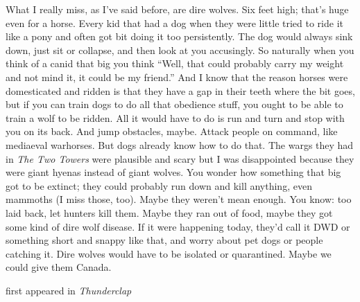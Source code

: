 What I really miss, as I've said before, are dire wolves. Six feet high;
that's huge even for a horse. Every kid that had a dog when they were
little tried to ride it like a pony and often got bit doing it too
persistently. The dog would always sink down, just sit or collapse, and
then look at you accusingly. So naturally when you think of a canid that
big you think ``Well, that could probably carry my weight and not mind
it, it could be my friend.'' And I know that the reason horses were
domesticated and ridden is that they have a gap in their teeth where the
bit goes, but if you can train dogs to do all that obedience stuff, you
ought to be able to train a wolf to be ridden. All it would have to do
is run and turn and stop with you on its back. And jump obstacles,
maybe. Attack people on command, like mediaeval warhorses. But dogs
already know how to do that. The wargs they had in \emph{The Two Towers}
were plausible and scary but I was disappointed because they were giant
hyenas instead of giant wolves. You wonder how something that big got to
be extinct; they could probably run down and kill anything, even
mammoths (I miss those, too). Maybe they weren't mean enough. You know:
too laid back, let hunters kill them. Maybe they ran out of food, maybe
they got some kind of dire wolf disease. If it were happening today,
they'd call it DWD or something short and snappy like that, and worry
about pet dogs or people catching it. Dire wolves would have to be
isolated or quarantined. Maybe we could give them Canada.

first appeared in \emph{Thunderclap}

